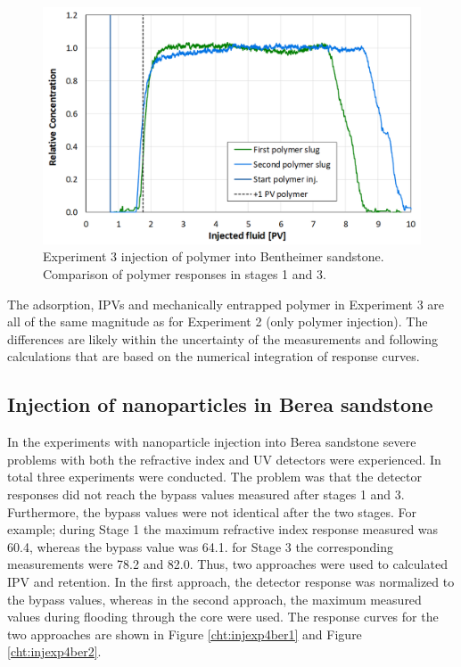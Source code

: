 \begin{figure}[h!]
    \centering
    \includegraphics[width=.85\textwidth]{img/cht/injexp3bentPol.png}
    \caption{Experiment 3 injection of polymer into Bentheimer sandstone. Comparison of polymer responses in stages 1 and 3.}
    \label{cht:injexp3bentPol}
\end{figure}

The adsorption, IPVs and mechanically entrapped polymer in Experiment 3 are all of the same magnitude as for Experiment 2 (only polymer injection). The differences are likely within the uncertainty of the measurements and following calculations that are based on the numerical integration of response curves.



\subsection{Injection of nanoparticles in Berea sandstone}
In the experiments with nanoparticle injection into  Berea sandstone severe problems with both the refractive index and UV detectors were experienced. In total three experiments were conducted. The problem was that the detector responses did not reach the bypass values measured after stages 1 and 3. Furthermore, the bypass values were not identical after the two stages. For example; during Stage 1 the maximum refractive index response measured was 60.4, whereas the bypass value was 64.1. for Stage 3 the corresponding measurements were 78.2 and 82.0. Thus, two approaches were used to calculated IPV and retention. In the first approach, the detector response was normalized to the bypass values, whereas in the second approach, the maximum measured values during flooding through the core were used. The response curves for the two approaches are shown in Figure \ref{cht:injexp4ber1} and Figure \ref{cht:injexp4ber2}. 

